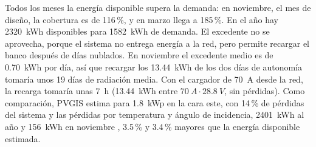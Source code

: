 Todos los meses la energía disponible supera la demanda: en noviembre, el mes de diseño, la cobertura es de 116\,\%, y en marzo llega a 185\,\%. En el año hay \SI{2320}{kWh} disponibles para \SI{1582}{kWh} de demanda. El excedente no se aprovecha, porque el sistema no entrega energía a la red, pero permite recargar el banco después de días nublados. En noviembre el excedente medio es de \SI{0.70}{kWh} por día, así que recargar los \SI{13.44}{kWh} de los dos días de autonomía tomaría unos 19 días de radiación media. Con el cargador de \SI{70}{A} desde la red, la recarga tomaría unas 7~h (\SI{13.44}{kWh} entre $\SI{70}{A}\cdot\SI{28.8}{V}$, sin pérdidas). Como comparación, PVGIS estima para \SI{1.8}{kWp} en la cara este, con 14\,\% de pérdidas del sistema y las pérdidas por temperatura y ángulo de incidencia, \SI{2401}{kWh} al año y \SI{156}{kWh} en noviembre \cite{pvgis}, 3.5\,\% y 3.4\,\% mayores que la energía disponible estimada.
